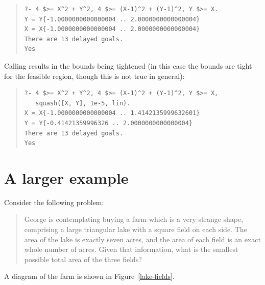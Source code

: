 \begin{quote}\begin{verbatim}
?- 4 $>= X^2 + Y^2, 4 $>= (X-1)^2 + (Y-1)^2, Y $>= X.
Y = Y{-1.0000000000000004 .. 2.0000000000000004}
X = X{-1.0000000000000004 .. 2.0000000000000004}
There are 13 delayed goals.
Yes
\end{verbatim}\end{quote}

Calling  results in the
bounds being tightened (in this case the bounds are tight for the feasible
region, though this is not true in general):

\begin{quote}\begin{verbatim}
?- 4 $>= X^2 + Y^2, 4 $>= (X-1)^2 + (Y-1)^2, Y $>= X,
   squash([X, Y], 1e-5, lin).
X = X{-1.0000000000000004 .. 1.4142135999632601}
Y = Y{-0.41421359996326 .. 2.0000000000000004}
There are 13 delayed goals.
Yes
\end{verbatim}\end{quote}



\section{A larger example}
\label{farm-example}

Consider the following problem:

\begin{quote}
George is contemplating buying a farm which is a very strange shape,
comprising a large triangular lake with a square field on each side.  The
area of the lake is exactly seven acres, and the area of each field is an
exact whole number of acres.  Given that information, what is the smallest
possible total area of the three fields?
\end{quote}

A diagram of the farm is shown in Figure~\ref{lake-fields}.

